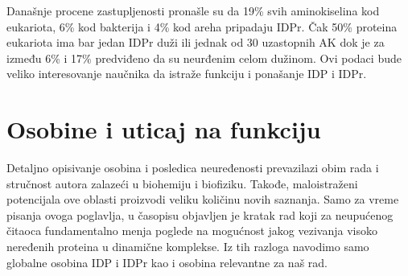 Današnje procene zastupljenosti pronašle su da 19\% svih aminokiselina
kod eukariota, 6\% kod bakterija i 4\% kod areha pripadaju IDPr\parencite{peng2015b}.
Čak 50\% proteina eukariota ima bar jedan IDPr duži ili jednak od 30 uzastopnih AK\parencite{Xue2012}
dok je za između 6\% i 17\% predviđeno da su neurđenim celom dužinom\parencite{tompa2002}.
Ovi podaci bude veliko interesovanje naučnika da istraže funkciju i ponašanje
IDP i IDPr.

\section {Osobine i uticaj na funkciju}

Detaljno opisivanje osobina i posledica neuređenosti prevazilazi obim rada i
stručnost autora zalazeći u biohemiju i biofiziku. Takođe, maloistraženi
potencijala ove oblasti proizvodi veliku količinu novih saznanja. Samo za vreme
pisanja ovoga poglavlja, u časopisu   objavljen je kratak
rad\parencite{rebecca2018} koji za neupućenog čitaoca fundamentalno menja
poglede na mogućnost jakog vezivanja visoko neređenih proteina u dinamične
komplekse.  Iz tih razloga navodimo samo globalne osobina IDP i IDPr kao i
osobina relevantne za naš rad.


